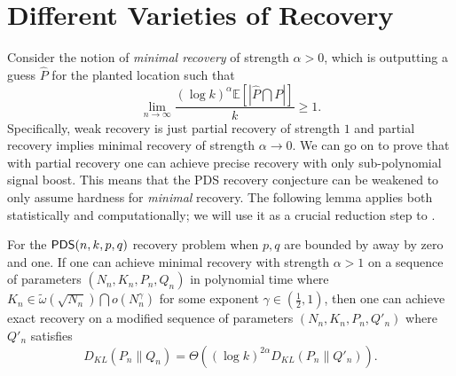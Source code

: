 \documentclass[final,12pt]{colt2023} %
\newcommand\1[1]{\mathbb{I}_{\left\{#1\right\}}}
\begin{document}
\section{Different Varieties of Recovery}
\label{recovs}
Consider the notion of \emph{minimal recovery} of strength $\alpha>0$, which is outputting a guess $\hat P$ for the planted location such that $$\lim_{n\to\infty}\frac{(\log k)^{\alpha} \mathbb{E}[|\hat P\bigcap P|]}{k}\geq 1.$$ Specifically, weak recovery is just partial recovery of strength $1$ and partial recovery implies minimal recovery of strength $\alpha\to 0$. We can go on to prove that with partial recovery one can achieve precise recovery with only sub-polynomial signal boost. This means that the PDS recovery conjecture can be weakened to only assume hardness for \emph{minimal} recovery. The following lemma applies both statistically and computationally; we will use it as a crucial reduction step to .
\begin{lemma}\label{partialtofull}
For the $\mathsf{PDS}(n, k, p, q)$ recovery problem when $p, q$ are bounded by away by zero and one. If one can achieve minimal recovery with strength $\alpha>1$ on a sequence of parameters $(N_n, K_n, P_n, Q_n)$ in polynomial time where $K_n\in \tilde{\omega}(\sqrt{N_n})\bigcap o(N_n^{\gamma})$ for some exponent $\gamma\in (\frac{1}{2}, 1)$, then one can achieve exact recovery on a modified sequence of parameters $(N_n, K_n, P_n, Q'_n)$ where $Q'_n$ satisfies $$D_{KL}(P_n\|Q_n)=\Theta((\log k)^{2\alpha}D_{KL}(P_n\|Q'_n)).$$
\end{lemma}
\end{document}
